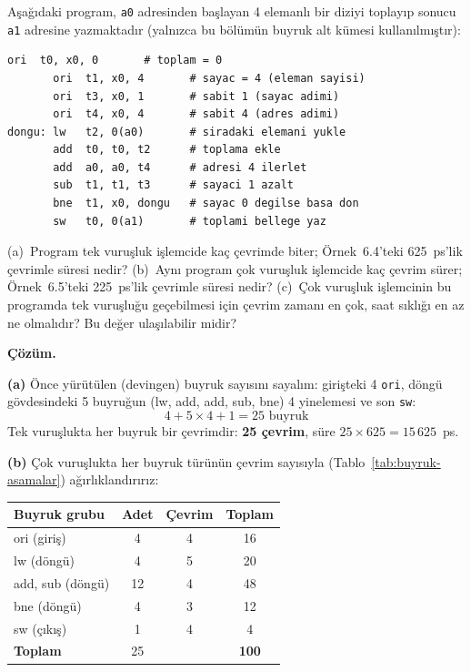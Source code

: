 \begin{ornek}
Aşağıdaki program, \texttt{a0} adresinden başlayan 4 elemanlı bir diziyi toplayıp sonucu \texttt{a1} adresine yazmaktadır (yalnızca bu bölümün buyruk alt kümesi kullanılmıştır):

\begin{lstlisting}[style=riscv]
       ori  t0, x0, 0       # toplam = 0
       ori  t1, x0, 4       # sayac = 4 (eleman sayisi)
       ori  t3, x0, 1       # sabit 1 (sayac adimi)
       ori  t4, x0, 4       # sabit 4 (adres adimi)
dongu: lw   t2, 0(a0)       # siradaki elemani yukle
       add  t0, t0, t2      # toplama ekle
       add  a0, a0, t4      # adresi 4 ilerlet
       sub  t1, t1, t3      # sayaci 1 azalt
       bne  t1, x0, dongu   # sayac 0 degilse basa don
       sw   t0, 0(a1)       # toplami bellege yaz
\end{lstlisting}

(a)~Program tek vuruşluk işlemcide kaç çevrimde biter; Örnek~6.4'teki 625~ps'lik çevrimle süresi nedir? (b)~Aynı program çok vuruşluk işlemcide kaç çevrim sürer; Örnek~6.5'teki 225~ps'lik çevrimle süresi nedir? (c)~Çok vuruşluk işlemcinin bu programda tek vuruşluğu geçebilmesi için çevrim zamanı en çok, saat sıklığı en az ne olmalıdır? Bu değer ulaşılabilir midir?

\tcblower
\textbf{Çözüm.}

\textbf{(a)} Önce yürütülen (devingen) buyruk sayısını sayalım: girişteki 4 \texttt{ori}, döngü gövdesindeki 5 buyruğun (lw, add, add, sub, bne) 4 yinelemesi ve son \texttt{sw}:
\[
4 + 5 \times 4 + 1 = 25 \text{ buyruk}
\]
Tek vuruşlukta her buyruk bir çevrimdir: \textbf{25 çevrim}, süre $25 \times 625 = 15\,625$~ps.

\textbf{(b)} Çok vuruşlukta her buyruk türünün çevrim sayısıyla (Tablo~\ref{tab:buyruk-asamalar}) ağırlıklandırırız:

\begin{center}
\small
\begin{tabular}{@{}lccc@{}}
\toprule
\textbf{Buyruk grubu} & \textbf{Adet} & \textbf{Çevrim} & \textbf{Toplam} \\
\midrule
ori (giriş) & 4 & 4 & 16 \\
lw (döngü) & 4 & 5 & 20 \\
add, sub (döngü) & 12 & 4 & 48 \\
bne (döngü) & 4 & 3 & 12 \\
sw (çıkış) & 1 & 4 & 4 \\
\midrule
\textbf{Toplam} & 25 & & \textbf{100} \\
\bottomrule
\end{tabular}
\end{center}


\end{ornek}
